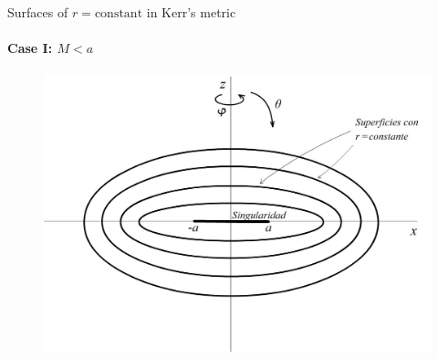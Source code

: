 \documentclass{beamer}
\begin{document}
        \begin{frame}{Surfaces of $r=\textrm{constant}$ in Kerr's metric}
        \framesubtitle{Case I: $M<a$}
        	\begin{center}
				\begin{figure}
				\includegraphics[scale=0.75] {figures/fig35.jpg}
				\end{figure}
			\end{center}	
        \end{frame}
        
\end{document}

